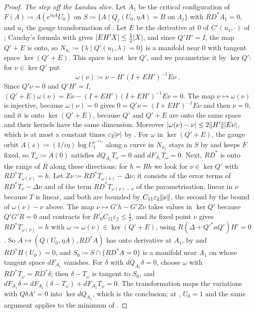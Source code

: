 \documentclass[11pt]{preprint}
\DeclarePairedDelimiter{\abs}{\lvert}{\rvert}
\DeclarePairedDelimiter{\norm}{\lVert}{\rVert}
\numberwithin{equation}{section}
\theoremstyle{definition}
\theoremstyle{remark}
\theoremstyle{plain}
\begin{document}
\begin{proof}
\emph{The step off the Landau slice.} Let $A_1$ be the critical configuration of $F(A) \coloneqq A(e^{i\eta A}U_0)$ on $S \coloneqq \{A \mid Q_j(U_0, \eta A) = B \text{ on } \Lambda_j\}$ with $RD^*A_1 = 0$, and $u_1$ the gauge transformation of \cite[(124)]{BalabanVAR}. Let $E$ be the derivative at $0$ of $C'(u_1, \cdot)$ of \cite[(213)]{BalabanAVG}; Cauchy's formula with \cite[(214)]{BalabanAVG} gives $\abs{EH'X} \leq \frac12\abs X$, and since $Q'H' = I$, the map $Q' + E$ is onto, so $N_{u_1} \coloneqq \{\lambda \mid Q'(u_1, \lambda) = 0\}$ is a manifold near $0$ with tangent space $\ker(Q' + E)$. This space is not $\ker Q'$, and we parametrise it by $\ker Q'$: for $\nu \in \ker Q'$ put
\[
    \omega(\nu) \coloneqq \nu - H'(I + EH')^{-1}E\nu\;.
\]
Since $Q'\nu = 0$ and $Q'H' = I$, $(Q' + E)\omega(\nu) = E\nu - (I + EH')(I + EH')^{-1}E\nu = 0$. The map $\nu \mapsto \omega(\nu)$ is injective, because $\omega(\nu) = 0$ gives $0 = Q'\nu = (I + EH')^{-1}E\nu$ and then $\nu = 0$, and it is onto $\ker(Q' + E)$, because $Q'$ and $Q' + E$ are onto the same space and their kernels have the same dimension. Moreover $\abs{\omega(\nu) - \nu} \leq 2\norm{H'}\abs{E\nu}$, which is at most a constant times $\varepsilon_2\abs\nu$ by \cite[(214)]{BalabanAVG}. For $\omega$ in $\ker(Q' + E)$, the gauge orbit $A(s) \coloneqq (1/i\eta)\log U_1^{e^{-i\lambda_s}}$ along a curve in $N_{u_1}$ stays in $S$ by \cite[(1.30)--(1.31)]{BalabanREG} and keeps $F$ fixed, so $T_\omega \coloneqq \dot A(0)$ satisfies $dQ_{A_1}T_\omega = 0$ and $dF_{A_1}T_\omega = 0$. Next, $RD^*$ is onto the range of $R$ along these directions: for $h = Rh$ we look for $\nu \in \ker Q'$ with $RD^*T_{\omega(\nu)} = h$. Let $Z\nu \coloneqq RD^*T_{\omega(\nu)} - \Delta\nu$; it consists of the error terms of $RD^*T_\nu - \Delta\nu$ and of the term $RD^*T_{\omega(\nu) - \nu}$ of the parametrisation, linear in $\nu$ because $T$ is linear, and both are bounded by $C_{11}\varepsilon_2\norm\nu$, the second by the bound of $\omega(\nu) - \nu$ above. The map $\nu \mapsto G'h - G'Z\nu$ takes values in $\ker Q'$ because $Q'G'R = 0$ \cite[p.~93, l.~15]{BalabanREG} and contracts for $B'_0C_{11}\varepsilon_2 \leq \frac12$, and its fixed point $\nu$ gives $RD^*T_{\omega(\nu)} = h$ with $\omega \coloneqq \omega(\nu) \in \ker(Q' + E)$, using $R(\Delta + Q'^*aQ')H' = 0$. So $A \mapsto (Q(U_0, \eta A), RD^*A)$ has onto derivative at $A_1$, by \cite[(1.56)]{BalabanREG} and $RD^*H(U_0) = 0$, and $S_0 \coloneqq S \cap \{RD^*A = 0\}$ is a manifold near $A_1$ on whose tangent space $dF_{A_1}$ vanishes. For $\delta$ with $dQ_{A_1}\delta = 0$, choose $\omega$ with $RD^*T_\omega = RD^*\delta$; then $\delta - T_\omega$ is tangent to $S_0$, and $dF_{A_1}\delta = dF_{A_1}(\delta - T_\omega) + dF_{A_1}T_\omega = 0$. The transformation \cite[(47)]{BalabanVAR} maps the variations with $Q\delta A' = 0$ into $\ker dQ_{A_1}$, which is the conclusion; at \cite[p.~302, l.~30]{BalabanVAR}, $U_0 = 1$ and the same argument applies to the minimum of \cite[(157)]{BalabanVAR}.
\end{proof}
\end{document}
